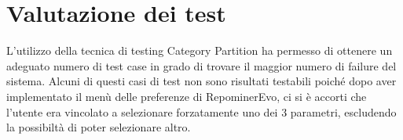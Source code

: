 \chapter{Valutazione dei test}
L'utilizzo della tecnica di testing Category Partition ha permesso di ottenere un adeguato numero di test case in grado di trovare il maggior numero di failure del sistema.
Alcuni di questi casi di test non sono risultati testabili poiché dopo aver implementato il menù delle preferenze di RepominerEvo, ci si è accorti che l'utente era vincolato a selezionare forzatamente uno dei 3 parametri, escludendo la possibiltà di poter selezionare altro.